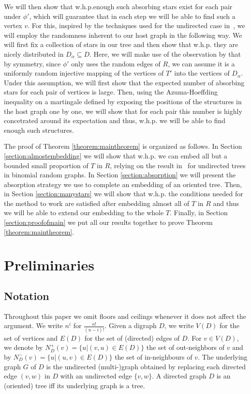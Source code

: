 \documentclass[10pt, a4paper]{article}
\theoremstyle{remark}
\begin{document}
We will then show that w.h.p.\hspace{0.35em}enough such absorbing stars exist for each pair under $\phi'$, which will guarantee that in each step we will be able to find such a vertex $v$. For this, inspired by the techniques used for the undirected case in~\cite{bottcher2020embedding,undirected_spanning_universality}, we will employ the randomness inherent to our host graph in the following way.
We will first fix a collection of stars in our tree and then show that w.h.p. they are nicely distributed in $D_\alpha \subseteq D$.
Here, we will make use of the observation by \cite{krivelevich_bounded-degree_2016} that by symmetry, since $\phi'$ only uses the random edges of $R$, we can assume it is a uniformly random injective mapping of the vertices of $T'$ into the vertices of $D_{\alpha}$.
Under this assumption, we will first show that the expected number of absorbing stars for each pair of vertices is large.
Then, using the Azuma-Hoeffding inequality on a martingale defined by exposing the positions of the structures in the host graph one by one, we will show that for each pair this number is highly concetrated around its expectation and thus, w.h.p. we will be able to find enough such structures.

\vspace{10pt}


The proof of Theorem \ref{theorem:maintheorem} is organized as follows.
In Section \ref{section:almostembedding} we will show that w.h.p. we can embed all but a bounded small proportion of $T$ in $R$, relying on the result in~\cite{alon_embedding_2007} for undirected trees in binomial random graphs.
In Section \ref{section:absorption} we will present the absorption strategy we use to complete an embedding of an oriented tree.
Then, in Section \ref{section:manystars} we will show that w.h.p. the conditions needed for the method to work are satisfied after embedding almost all of $T$ in $R$ and thus we will be able to extend our embedding to the whole $T$.
Finally, in Section \ref{section:proofofmain} we put all our results together to prove Theorem \ref{theorem:maintheorem}.

\section{Preliminaries}
\subsection*{Notation}
Throughout this paper we omit floors and ceilings whenever it does not affect the argument.
We write $n^{\underline{i}}$ for $\frac{n!}{(n-i)!}$.
Given a digraph $D$, we write $V(D)$ for the set of vertices and $E(D)$ for the set of (directed) edges of $D$.
For $v \in V(D)$, we denote by $N_D^+(v) = \{u | (v, u) \in E(D)\}$ the set of out-neighbors of $v$ and by $N_D^-(v) = \{u | (u, v) \in E(D)\}$ the set of in-neighbours of $v$.
The underlying graph $G$ of $D$ is the undirected (multi-)graph obtained by replacing each directed edge $(v, w)$ in $D$ with an undirected edge $\{v, w\}$.
A directed graph $D$ is an (oriented) tree iff its underlying graph is a tree.
\end{document}
